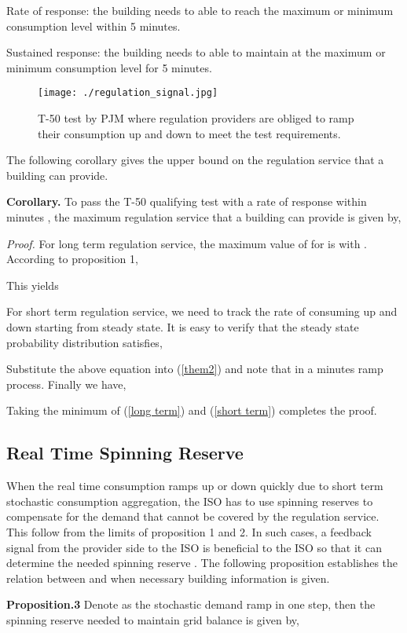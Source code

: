 \documentclass[journal]{IEEEtran}
\begin{document}
 Rate of response: the building needs to able to reach the maximum or minimum consumption level within 5 minutes.

 Sustained response: the building needs to able to maintain at the maximum or minimum consumption level for 5 minutes. 

\begin{figure}[htb]
\centering
\label{regulation_signal}
\texttt{[image: ./regulation\_signal.jpg]}
\caption{T-50 test by PJM where regulation providers are obliged to ramp their consumption up and down to meet the test requirements.}
\end{figure}

The following corollary gives the upper bound on the regulation service that a building can provide.

\textbf{Corollary.} To pass the T-50 qualifying test with a rate of response within  minutes , the maximum regulation service  that a building can provide is given by,


\textit{Proof.} For long term regulation service, the maximum value of  for  is  with . According to proposition 1,

This yields

For short term regulation service, we need to track the rate of consuming up and down starting from steady state. It is easy to verify that the steady state probability distribution satisfies,

Substitute the above equation into (\ref{them2}) and note that  in a  minutes ramp process. Finally we have,

Taking the minimum of (\ref{long term}) and (\ref{short term}) completes the proof. 

\subsection{Real Time Spinning Reserve}
When the real time consumption  ramps up or down quickly due to short term stochastic consumption aggregation, the ISO has to use spinning reserves to compensate for the demand that cannot be covered by the regulation service. This follow from the limits of proposition 1 and 2. In such cases, a feedback signal from the provider side to the ISO is beneficial to the ISO so that it can determine the needed spinning reserve . The following proposition establishes the relation between  and  when necessary building information is given. 

\textbf{Proposition.3} Denote  as the stochastic demand ramp in one step, then the spinning reserve  needed to maintain grid balance is given by,
\end{document}
